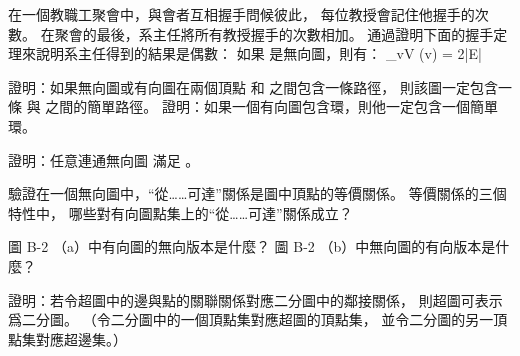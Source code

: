 \startsection[
  title={Graphs},
  reference=section:appendix_graphs,
]

\startEXERCISE
在一個教職工聚會中，與會者互相握手問候彼此，
每位教授會記住他握手的次數。
在聚會的最後，系主任將所有教授握手的次數相加。
通過證明下面的{\EMP 握手定理}來說明系主任得到的結果是偶數：
如果  是無向圖，則有：
\startformula
\sum_{v\in V} (v) = 2|E|
\stopformula
\stopEXERCISE

\startANSWER
{}
\stopANSWER

\startEXERCISE
證明：如果無向圖或有向圖在兩個頂點  和  之間包含一條路徑，
則該圖一定包含一條  與  之間的簡單路徑。
證明：如果一個有向圖包含環，則他一定包含一個簡單環。
\stopEXERCISE

\startANSWER
{}
\stopANSWER

\startEXERCISE
證明：任意連通無向圖  滿足 。
\stopEXERCISE

\startANSWER
{}
\stopANSWER

\startEXERCISE
驗證在一個無向圖中，“從……可達”關係是圖中頂點的等價關係。
等價關係的三個特性中，
哪些對有向圖點集上的“從……可達”關係成立？
\stopEXERCISE

\startANSWER
{}
\stopANSWER

\startEXERCISE
圖 B-2 （a）中有向圖的無向版本是什麼？
圖 B-2 （b）中無向圖的有向版本是什麼？
\stopEXERCISE

\startANSWER
{}
\stopANSWER

\startEXERCISE\DIFFICULT
證明：若令超圖中的邊與點的關聯關係對應二分圖中的鄰接關係，
則超圖可表示爲二分圖。
（\hint 令二分圖中的一個頂點集對應超圖的頂點集，
並令二分圖的另一頂點集對應超邊集。）
\stopEXERCISE

\startANSWER
{}
\stopANSWER

\stopsection
